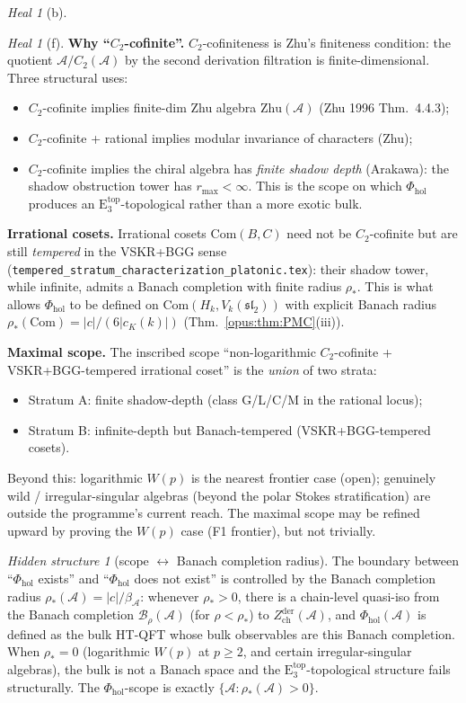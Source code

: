 \documentclass{article}
\theoremstyle{definition}
\theoremstyle{remark}
\newtheorem{heal}[theorem]{Heal}
\newtheorem{hidden}[theorem]{Hidden structure}
\newcommand{\Phihol}{\Phi_{\mathrm{hol}}}
\newcommand{\Zder}{Z^{\mathrm{der}}_{\mathrm{ch}}}
\newcommand{\Etop}[1]{\mathrm{E}_{#1}^{\mathrm{top}}}
\newcommand{\cA}{\mathcal{A}}
\begin{document}
\begin{heal}[b]
\begin{heal}[f]
\textbf{Why ``$C_2$-cofinite''.} $C_2$-cofiniteness is
Zhu's finiteness condition: the quotient
$\cA / C_2(\cA)$ by the second derivation filtration is
finite-dimensional. Three structural uses:
\begin{itemize}
\item $C_2$-cofinite implies finite-dim Zhu algebra
$\mathrm{Zhu}(\cA)$ (Zhu 1996 Thm.~4.4.3);
\item $C_2$-cofinite + rational implies modular invariance
of characters (Zhu);
\item $C_2$-cofinite implies the chiral algebra has
\emph{finite shadow depth} (Arakawa): the shadow
obstruction tower has $r_{\max} < \infty$. This is the
scope on which $\Phihol$ produces an $\Etop{3}$-topological
rather than a more exotic bulk.
\end{itemize}

\textbf{Irrational cosets.} Irrational cosets
$\mathrm{Com}(B, C)$ need not be $C_2$-cofinite but are
still \emph{tempered} in the VSKR+BGG sense
(\texttt{tempered\_stratum\_characterization\_platonic.tex}):
their shadow tower, while infinite, admits a Banach
completion with finite radius $\rho_*$. This is what
allows $\Phihol$ to be defined on
$\mathrm{Com}(H_k, V_k(\mathfrak{sl}_2))$ with explicit
Banach radius
$\rho_*(\mathrm{Com}) = |c| / (6|c_K(k)|)$
(Thm.~\ref*{opus:thm:PMC}(iii)).

\textbf{Maximal scope.} The inscribed scope
``non-logarithmic $C_2$-cofinite + VSKR+BGG-tempered
irrational coset'' is the \emph{union} of two strata:
\begin{itemize}
\item Stratum A: finite shadow-depth (class G/L/C/M in the
rational locus);
\item Stratum B: infinite-depth but Banach-tempered
(VSKR+BGG-tempered cosets).
\end{itemize}
Beyond this: logarithmic $W(p)$ is the nearest frontier
case (open); genuinely wild / irregular-singular algebras
(beyond the polar Stokes stratification) are outside the
programme's current reach. The maximal scope may be refined
upward by proving the $W(p)$ case (F1 frontier), but not
trivially.

\begin{hidden}[scope $\leftrightarrow$ Banach completion radius]
\label{hidden:cycle6}
The boundary between ``$\Phihol$ exists'' and ``$\Phihol$
does not exist'' is controlled by the Banach completion
radius $\rho_*(\cA) = |c|/\beta_\cA$: whenever $\rho_* > 0$,
there is a chain-level quasi-iso from the Banach completion
$\mathcal{B}_{\rho}(\cA)$ (for $\rho < \rho_*$) to
$\Zder(\cA)$, and $\Phihol(\cA)$ is defined as the bulk
HT-QFT whose bulk observables are this Banach completion.
When $\rho_* = 0$ (logarithmic $W(p)$ at $p \ge 2$, and
certain irregular-singular algebras), the bulk is not a
Banach space and the $\Etop{3}$-topological structure fails
structurally. The $\Phihol$-scope is exactly
$\{\cA : \rho_*(\cA) > 0\}$.
\end{hidden}
\end{heal}


\end{heal}
\end{document}
